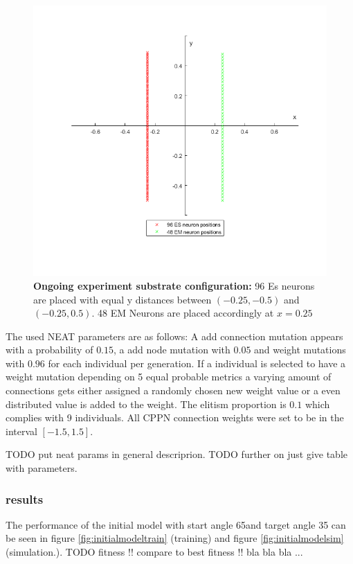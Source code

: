 \begin{figure}[tb]
	\centering
	\includegraphics[width=0.7\linewidth]{figures/OngoingModel/OngoingSubstrate}
	\caption[Ongoing experiment substrate configuration]{\textbf{Ongoing experiment substrate configuration:} 96 Es neurons are placed with equal y distances between $(-0.25,-0.5)$ and $(-0.25,0.5)$. 48 EM Neurons are placed accordingly at $x=0.25$}
	\label{fig:ongoingsubstrate}
\end{figure}

The used NEAT parameters are as follows: A add connection mutation appears with a probability  of $0.15$, a add node mutation with $0.05$ and weight mutations with $0.96$ for each individual per generation. If a individual is selected to have a weight mutation depending on 5 equal probable metrics a varying amount of connections gets either assigned a randomly chosen new weight value or a even distributed value is added to the weight. The elitism proportion is $0.1$ which complies with 9 individuals. All CPPN connection weights were set to be in the interval $[-1.5,1.5]$.

TODO put neat params in general descriprion. 
TODO further on just give table with parameters.
\subsubsection{results}
The performance of the initial model with start angle 65\degree and target angle 35 \degree can be seen in figure \ref{fig:initialmodeltrain} (training) and figure \ref{fig:initialmodelsim} (simulation.). TODO fitness !! compare to best fitness !! bla bla bla ...

